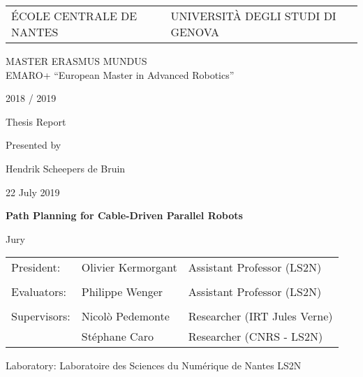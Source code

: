 \def\lskip{\vspace{0.5cm}}


\begin{tabular}{p{7cm}p{8cm}}
	ÉCOLE CENTRALE DE NANTES & UNIVERSITÀ DEGLI STUDI DI GENOVA
\end{tabular}

\vspace{2cm}

\begin{center}
	\large\sc MASTER ERASMUS MUNDUS \\ 
	\normalsize{EMARO+ ``European Master in Advanced Robotics''}
\end{center}

\begin{center}
	2018 / 2019
	\lskip%

	Thesis Report
	\lskip%

	Presented by
	\lskip%

	Hendrik Scheepers de Bruin
	\lskip%

	22 July 2019
	\lskip\lskip%

	{\Large \textbf{Path Planning for Cable-Driven Parallel Robots}}

\end{center}

\vfill

\begin{center}
	Jury
\end{center}

\begin{tabular}{p{} p{} p{}}
	President:		& Olivier Kermorgant	& Assistant Professor (LS2N) \\
	\\
	Evaluators:		& Philippe Wenger 		& Assistant Professor (LS2N) \\
	\\
	Supervisors:	& Nicolò Pedemonte		& Researcher (IRT Jules Verne) \\
					& Stéphane Caro			& Researcher (CNRS - LS2N) \\
\end{tabular}

\lskip%

Laboratory: Laboratoire des Sciences du Numérique de Nantes LS2N
